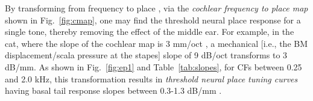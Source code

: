 \documentclass{ws-p8-50x6-00}
\newcommand{\Fig}[1]{Fig.~\ref{fig:#1}}
\newcommand{\Tab}[1]{Table~\ref{tab:#1}}
\begin{document}
\begin{figure}[ht]
\begin{minipage}{1.75in}
\end{minipage}
\hfill
{}
\end{figure}

By transforming from frequency to place \cite{Allen90b}, via the \emph{cochlear
frequency to place map} shown in \Fig{cmap}, one may find the threshold neural
place response for a single tone, thereby removing the effect of the middle ear.
For example, in the cat,
where the slope of the cochlear map is 3 mm/oct \cite{Liberman82},
a mechanical [i.e., the BM displacement/scala pressure at the stapes]
slope of 9 dB/oct transforms to 3 dB/mm.
As shown in \Fig{ep1} and \Tab{slopes}, for CFs between 0.25
and 2.0 kHz, this transformation results in \emph{threshold neural place
tuning curves} having basal tail response slopes between 0.3-1.3 dB/mm
\cite{Allen99d}.
\end{document}
